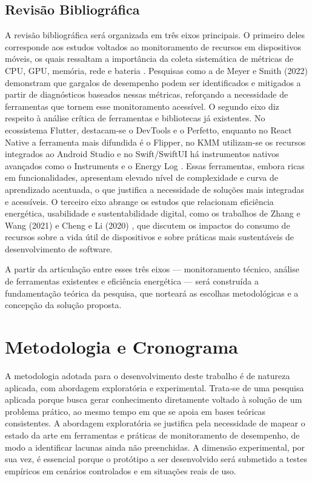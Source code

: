 \documentclass[12pt,a4paper]{article}
\begin{document}
\subsection{Revisão Bibliográfica}
A revisão bibliográfica será organizada em três eixos principais. O primeiro deles corresponde aos estudos voltados ao monitoramento de recursos em dispositivos móveis, os quais ressaltam a importância da coleta sistemática de métricas de CPU, GPU, memória, rede e bateria \cite{monitoring}. Pesquisas como a de Meyer e Smith (2022) \cite{performance} demonstram que gargalos de desempenho podem ser identificados e mitigados a partir de diagnósticos baseados nessas métricas, reforçando a necessidade de ferramentas que tornem esse monitoramento acessível. O segundo eixo diz respeito à análise crítica de ferramentas e bibliotecas já existentes. No ecossistema Flutter, destacam-se o DevTools e o Perfetto, enquanto no React Native a ferramenta mais difundida é o Flipper, no KMM utilizam-se os recursos integrados ao Android Studio e no Swift/SwiftUI há instrumentos nativos avançados como o Instruments e o Energy Log \cite{flutter, dart}. Essas ferramentas, embora ricas em funcionalidades, apresentam elevado nível de complexidade e curva de aprendizado acentuada, o que justifica a necessidade de soluções mais integradas e acessíveis. O terceiro eixo abrange os estudos que relacionam eficiência energética, usabilidade e sustentabilidade digital, como os trabalhos de Zhang e Wang (2021) \cite{energy} e Cheng e Li (2020) \cite{mobile_energy}, que discutem os impactos do consumo de recursos sobre a vida útil de dispositivos e sobre práticas mais sustentáveis de desenvolvimento de software.  

A partir da articulação entre esses três eixos — monitoramento técnico, análise de ferramentas existentes e eficiência energética — será construída a fundamentação teórica da pesquisa, que norteará as escolhas metodológicas e a concepção da solução proposta.

\section{Metodologia e Cronograma}

A metodologia adotada para o desenvolvimento deste trabalho é de natureza aplicada, com abordagem exploratória e experimental. Trata-se de uma pesquisa aplicada porque busca gerar conhecimento diretamente voltado à solução de um problema prático, ao mesmo tempo em que se apoia em bases teóricas consistentes. A abordagem exploratória se justifica pela necessidade de mapear o estado da arte em ferramentas e práticas de monitoramento de desempenho, de modo a identificar lacunas ainda não preenchidas. A dimensão experimental, por sua vez, é essencial porque o protótipo a ser desenvolvido será submetido a testes empíricos em cenários controlados e em situações reais de uso.  
\end{document}
